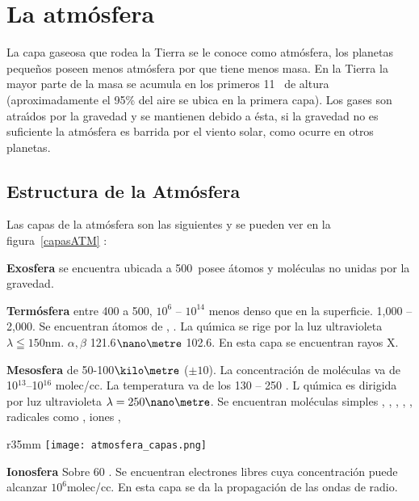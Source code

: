 \chapter{La atm\'osfera}
 
 La capa gaseosa que rodea la Tierra se le conoce como atm\'osfera, los planetas peque\~nos poseen menos atmósfera por que tiene menos masa. En la Tierra la  mayor parte de la masa se acumula en los primeros 11 \kilo\metre\,  de altura (aproximadamente el 95\% del aire se ubica en la primera capa). Los gases son atra\'{\i}dos por la gravedad y se mantienen debido a \'esta, si la gravedad no es suficiente la atm\'osfera es barrida por el viento solar, como ocurre en otros planetas.


 \section{Estructura de la Atm\'osfera}
  Las capas de la atm\'osfera son las siguientes y se pueden ver en la figura~\ref{capasATM} :


\textbf{Exosfera}  se encuentra ubicada a 500\kilo\metre\, posee \'atomos y mol\'eculas no unidas por la gravedad.

\textbf{ Term\'osfera }entre 400 a 500\kilo\metre, $10^6$ -- $10^{14}$ menos denso que en la superficie. 1,000 -- 2,000\kelvin. Se encuentran \'atomos de , . La qu\'{\i}mica se rige por la luz ultravioleta $\lambda\leqq 150$nm. $\alpha,\beta$ 121.6$\nano\metre$ 102.6\nano\metre. En esta capa se encuentran  rayos X.
 
 \textbf{Mesosfera} de 50-100$\kilo\metre$  ($\pm10$). La concentraci\'on de mol\'eculas va de 10$^{13}$--10$^{16}$ molec/cc. La temperatura va de los 130 -- 250 \kelvin. L qu\'{\i}mica es dirigida por luz ultravioleta $\lambda=250\nano\metre$. Se encuentran mol\'eculas simples , , , , , radicales como ,  iones ,
 
\begin{wrapfigure}[25]{r}{35mm}
\centering
\texttt{[image: atmosfera\_capas.png]}
\caption{Capas de la atm\'osfera}
\label{capasATM}
\end{wrapfigure}
 \textbf{Ionosfera} Sobre 60 \kilo\metre. Se encuentran electrones libres cuya concentraci\'on puede alcanzar $10^6$molec/cc. En esta capa se da la propagaci\'on de las ondas de radio.
 
